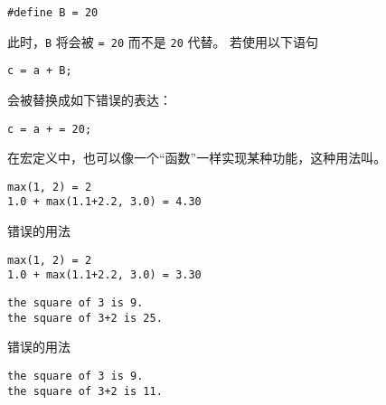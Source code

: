 \begin{frame}[fragile]

  \begin{free}[常见错误]{}
\begin{lstlisting}
#define B = 20
\end{lstlisting}
  \end{free}
  
\pause 

此时，\lstinline|B| 将会被 \lstinline|= 20| 而不是 \lstinline|20| 代替。 若使用以下语句
\begin{lstlisting}
c = a + B;
\end{lstlisting}
会被替换成如下错误的表达：
\begin{lstlisting}
c = a + = 20;
\end{lstlisting}
\end{frame}

\begin{frame}[fragile]
  \begin{defn}[]{}
    在宏定义中，也可以像一个“函数”一样实现某种功能，这种用法叫。  
  \end{defn} \pause 

  
  \pause 
  \begin{lstlisting}
max(1, 2) = 2
1.0 + max(1.1+2.2, 3.0) = 4.30
  \end{lstlisting}
\end{frame}

\begin{frame}[fragile]

  错误的用法
  
  \pause 
  \begin{lstlisting}
max(1, 2) = 2
1.0 + max(1.1+2.2, 3.0) = 3.30
  \end{lstlisting}
\end{frame}

\begin{frame}[fragile]

  
  \pause 
  \begin{lstlisting}
the square of 3 is 9.
the square of 3+2 is 25.
  \end{lstlisting}
\end{frame}

\begin{frame}[fragile]
  错误的用法
  
  \pause 
  \begin{lstlisting}
the square of 3 is 9.
the square of 3+2 is 11.
  \end{lstlisting}
\end{frame}



